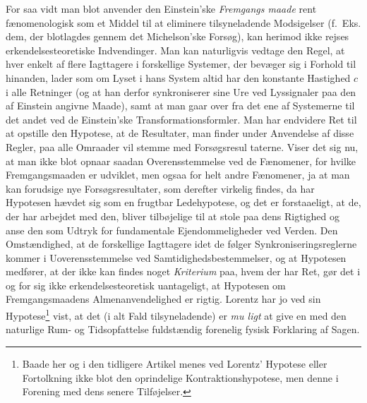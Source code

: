 \documentclass[12pt,a4paper]{article}
\newcommand{\opage}[1]{\marginnote{\footnotesize\textit{[#1]}}}
\begin{document}
For saa vidt man blot anvender den Einstein'ske \emph{Fremgangs\-%
maade} rent fænomenologisk som et Middel til at eliminere tilsyneladende
Modsigelser (f.~Eks. dem, der blotlagdes gennem det Michelson'ske Forsøg),
kan herimod ikke rejses erkendelsesteoretiske Indvendinger. Man kan
naturligvis vedtage den Regel, at hver enkelt af flere Iagttagere i
forskellige Systemer, der bevæger sig i Forhold til hinanden, lader som om
Lyset i hans System altid har den konstante Hastighed $c$ i alle Retninger
(og at han derfor synkroniserer sine Ure ved Lyssignaler paa den af Einstein
angivne Maade), samt at man gaar over fra det ene af Systemerne til det andet
ved de Einstein'ske Transformationsformler. Man har endvidere Ret til at
opstille den Hypotese, at de Resultater, man finder under Anvendelse af disse
Regler, paa alle Omraader vil stemme med Forsøgsresul\-%
\opage{166}taterne. Viser det sig nu, at man ikke blot opnaar saadan Overensstemmelse
ved de Fænomener, for hvilke Fremgangsmaaden er udviklet, men ogsaa for helt
andre Fænomener, ja at man kan forudsige nye Forsøgsresultater, som derefter
virkelig findes, da har Hypotesen hævdet sig som en frugtbar Ledehypotese, og
det er forstaaeligt, at de, der har arbejdet med den, bliver tilbøjelige til
at stole paa dens Rigtighed og anse den som Udtryk for fundamentale
Ejendommeligheder ved Verden. Den Omstændighed, at de forskellige Iagttagere
idet de følger Synkroniseringsreglerne kommer i Uoverensstemmelse ved
Samtidighedsbestemmelser, og at Hypotesen medfører, at der ikke kan findes
noget \emph{Kriterium} paa, hvem der har Ret, gør det i og for sig ikke
erkendelsesteoretisk uantageligt, at Hypotesen om Fremgangsmaadens
Almenanvendelighed er rigtig. Lorentz har jo ved sin
Hypotese\footnote{Baade her og i den tidligere Artikel menes ved Lorentz'
Hypotese eller Fortolkning ikke blot den oprindelige Kontraktionshypotese,
men denne i Forening med dens senere Tilføjelser.} vist, at det (i alt Fald
tilsyneladende) er \emph{mu\-%
ligt} at give en med den naturlige Rum- og Tidsopfattelse fuldstændig
forenelig fysisk Forklaring af Sagen.
\end{document}

